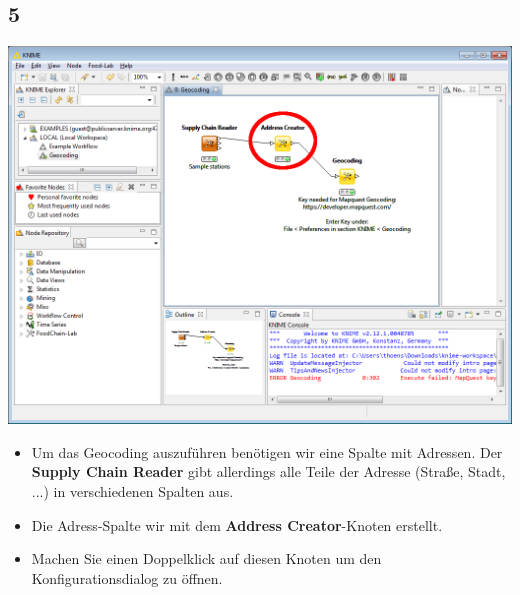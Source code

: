 \documentclass{beamer}
\begin{document}
\subsection{5}
\begin{frame}
	\begin{center}
  		\includegraphics[height=0.5\textheight]{5.png}
	\end{center}
	\begin{itemize}
		\item Um das Geocoding auszuführen benötigen wir eine Spalte mit Adressen. Der \textbf{Supply Chain Reader} gibt allerdings alle Teile der Adresse (Straße, Stadt, ...) in verschiedenen Spalten aus.
		\item Die Adress-Spalte wir mit dem \textbf{Address Creator}-Knoten erstellt.
		\item Machen Sie einen Doppelklick auf diesen Knoten um den Konfigurationsdialog zu öffnen.
	\end{itemize}
\end{frame}
\end{document}
